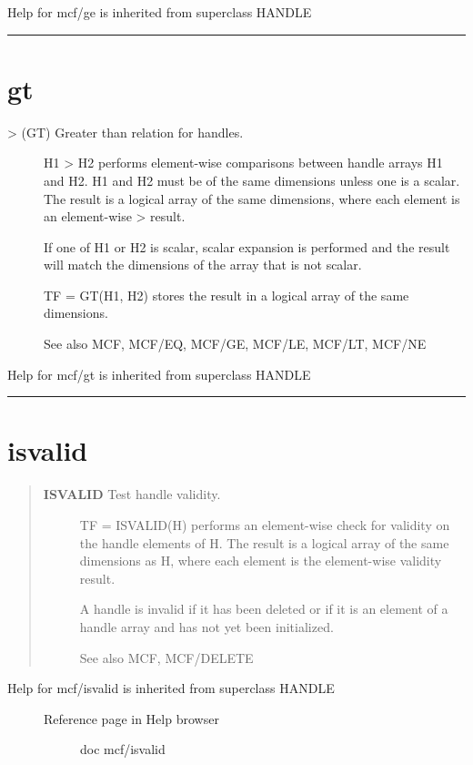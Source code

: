 \documentclass[letterpaper,10pt,english]{sphinxmanual}
\begin{document}
Help for mcf/ge is inherited from superclass HANDLE


\bigskip\hrule{}\bigskip



\section{gt}
\label{classes/utils/@mcf/mcf:id10}\label{classes/utils/@mcf/mcf:gt}\begin{description}
\item[{\textgreater{} (GT)   Greater than relation for handles.}] \leavevmode
H1 \textgreater{} H2 performs element-wise comparisons between handle arrays H1 and
H2.  H1 and H2 must be of the same dimensions unless one is a scalar.
The result is a logical array of the same dimensions, where each
element is an element-wise \textgreater{} result.

If one of H1 or H2 is scalar, scalar expansion is performed and the
result will match the dimensions of the array that is not scalar.

TF = GT(H1, H2) stores the result in a logical array of the same
dimensions.

See also MCF, MCF/EQ, MCF/GE, MCF/LE, MCF/LT, MCF/NE

\end{description}

Help for mcf/gt is inherited from superclass HANDLE


\bigskip\hrule{}\bigskip



\section{isvalid}
\label{classes/utils/@mcf/mcf:isvalid}\label{classes/utils/@mcf/mcf:id11}\begin{quote}
\begin{description}
\item[{\textbf{ISVALID}   Test handle validity.}] \leavevmode
TF = ISVALID(H) performs an element-wise check for validity on the
handle elements of H.  The result is a logical array of the same
dimensions as H, where each element is the element-wise validity
result.

A handle is invalid if it has been deleted or if it is an element
of a handle array and has not yet been initialized.

See also MCF, MCF/DELETE

\end{description}
\end{quote}
\begin{description}
\item[{Help for mcf/isvalid is inherited from superclass HANDLE}] \leavevmode\begin{description}
\item[{Reference page in Help browser}] \leavevmode
doc mcf/isvalid

\end{description}

\end{description}
\end{document}

